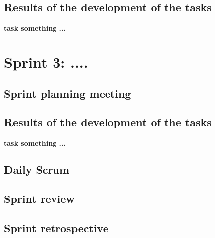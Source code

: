 
\subsection{Results of the development of the tasks}
\textbf{task something ...}






\section{Sprint 3: ....}

\subsection{Sprint planning meeting}



\subsection{Results of the development of the tasks}
\textbf{task something ...}


\subsection{Daily Scrum}

\subsection{Sprint review}

\subsection{Sprint retrospective}

